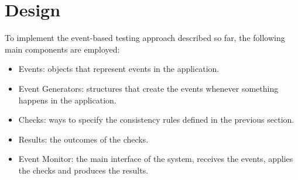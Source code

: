 \documentclass[11pt,a4paper,notitlepage]{article}
\begin{document}
\section{Design}\label{event_design}
To implement the event-based testing approach described so far, the following main components are employed:
\begin{itemize}
	\item Events: objects that represent events in the application.
	\item Event Generators: structures that create the events whenever something happens in the application.
	\item Checks: ways to specify the consistency rules defined in the previous section.
	\item Results: the outcomes of the checks.
	\item Event Monitor: the main interface of the system, receives the events, applies the checks and produces the results.
\end{itemize}
\end{document}

